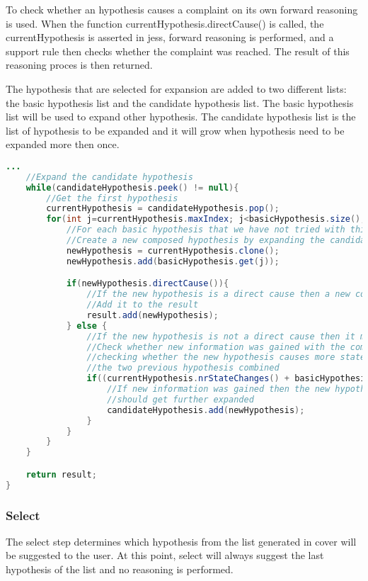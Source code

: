 To check whether an hypothesis causes a complaint on its own forward reasoning is used. When the function currentHypothesis.directCause() is called, the currentHypothesis is asserted in jess, forward reasoning is performed, and a support rule then checks whether the complaint was reached. The result of this reasoning proces is then returned.

The hypothesis that are selected for expansion are added to two different lists: the basic hypothesis list and the candidate hypothesis list. The basic hypothesis list will be used to expand other hypothesis. The candidate hypothesis list is the list of hypothesis to be expanded and it will grow when  hypothesis need to be expanded more then once.

\begin{lstlisting}[language=Java]
    ...
    //Expand the candidate hypothesis
    while(candidateHypothesis.peek() != null){
        //Get the first hypothesis
        currentHypothesis = candidateHypothesis.pop();
        for(int j=currentHypothesis.maxIndex; j<basicHypothesis.size(); j++){
            //For each basic hypothesis that we have not tried with this combination
            //Create a new composed hypothesis by expanding the candidate with the basic hypothesis
            newHypothesis = currentHypothesis.clone();
            newHypothesis.add(basicHypothesis.get(j));

            if(newHypothesis.directCause()){
                //If the new hypothesis is a direct cause then a new composed hypothesis has been found
                //Add it to the result
                result.add(newHypothesis);
            } else {
                //If the new hypothesis is not a direct cause then it might need further expanding.
                //Check whether new information was gained with the composed hypothesis by
                //checking whether the new hypothesis causes more state changes then
                //the two previous hypothesis combined
                if((currentHypothesis.nrStateChanges() + basicHypothesis.get(j).nrStateChanges() < newHypothesis.nrStateChanges())){
                    //If new information was gained then the new hypothesis
                    //should get further expanded
                    candidateHypothesis.add(newHypothesis);
                }
            }
        }
    }

    return result;
}
\end{lstlisting}

\subsubsection{Select}
The select step determines which hypothesis from the list generated in cover will be suggested to the user. At this point, select will always suggest the last hypothesis of the list and no reasoning is performed.

